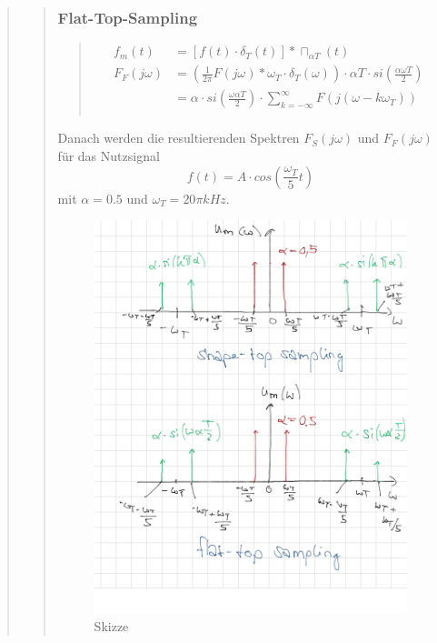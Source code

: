 \begin{quote}
\begin{quote}
        \subsubsection{Flat-Top-Sampling}
		\begin{quote}
			\begin{equation*}
            	\begin{split}
            		f_m (t) &= [f (t) \cdot \delta_T (t)] \ast \sqcap_{\alpha T} (t)\\
            		F_F (j\omega) &= \left ( \frac{1}{2 \pi} F (j\omega) \ast \omega_T
            		\cdot \delta_T (\omega) \right) \cdot \alpha T \cdot si (\frac{\alpha \omega T}{2})\\
            		&= \alpha \cdot si \left( \frac{\omega \alpha T}{2} \right) \cdot \sum_{k=-\infty}^{\infty} F(j(\omega -
            		k\omega_T))\\
            	\end{split}
            \end{equation*}
		\end{quote}
		
		Danach werden die resultierenden Spektren $F_S (j\omega)$ und $F_F (j\omega)$
		für das Nutzsignal
		\begin{equation*}
        f(t) = A \cdot cos(\frac{\omega_T}{5}t)    	
        \end{equation*}
		mit $\alpha = 0.5$ und $\omega_T = 20\pi kHz$.
		
		
		 \begin{figure}[H]
    \centering
        \includegraphics[scale=0.3, trim = 0cm 0cm 0cm 0cm,
        clip]{./Bilder/vorbereitungsskizze}
            \caption{Skizze}
  	    \end{figure}
		

\end{quote}
\end{quote}

